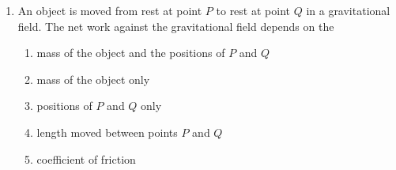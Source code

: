 \documentclass{../../../oss-legalpaper}
\begin{document}
\begin{multicols}{2}
\begin{enumerate}[leftmargin=18pt,resume]
  \item An object is moved from rest at point $P$ to rest at point $Q$ in a
    gravitational field. The net work against the gravitational field depends
    on the
    \begin{enumerate}[noitemsep,topsep=0pt,leftmargin=18pt,label=(\Alph*)]
    \item mass of the object and the positions of $P$ and $Q$
    \item mass of the object only
    \item positions of $P$ and $Q$ only
    \item length moved between points $P$ and $Q$
    \item coefficient of friction
    \end{enumerate}
    \columnbreak
%  
%
  

\end{enumerate}
\end{multicols}
\end{document}
